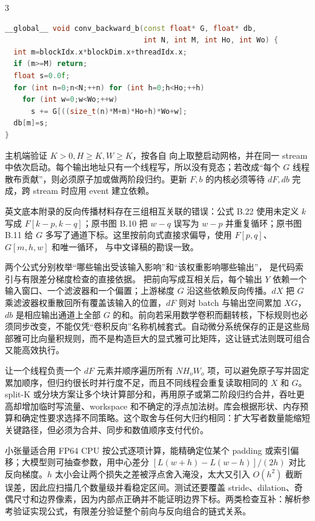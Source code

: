 \begin{solutionexercise}{3}
\begin{lstlisting}[language=C++]
__global__ void conv_backward_b(const float* G, float* db,
                                int N, int M, int Ho, int Wo) {
  int m=blockIdx.x*blockDim.x+threadIdx.x;
  if (m>=M) return;
  float s=0.0f;
  for (int n=0;n<N;++n) for (int h=0;h<Ho;++h)
    for (int w=0;w<Wo;++w)
      s += G[((size_t(n)*M+m)*Ho+h)*Wo+w];
  db[m]=s;
}
\end{lstlisting}
主机端验证 $K>0,H\ge K,W\ge K$，按各自  向上取整启动网格，并在同一
stream 中依次启动。每个输出地址只有一个线程写，所以没有竞态；若改成“每个 $G$ 线程
散布贡献”，则必须原子加或做两阶段归约。更新 $F,b$ 的内核必须等待 $dF,db$ 完成，跨
stream 时应用 event 建立依赖。

\editorialnote 英文底本附录的反向传播材料存在三组相互关联的错误：公式 B.22 使用未定义
$k$ 写成 $F[k-p,k-q]$；原书图 B.10 把 $w-q$ 误写为 $w-p$ 并重复循环；原书图 B.11 给
$G$ 多写了通道下标。这里按前向式直接求偏导，使用 $F[p,q]$、$G[m,h,w]$ 和唯一循环，
与中文译稿的勘误一致。

\conclusionheading 两个公式分别枚举“哪些输出受该输入影响”和“该权重影响哪些输出”，
是代码索引与有限差分梯度检查的直接依据。
\discussionheading
{}
把前向写成互相关后，每个输出 $Y$ 依赖一个输入窗口、一个滤波器和一个偏置；上游梯度 $G$ 沿这些依赖反向传播。$dX$ 把 $G$ 乘滤波器权重散回所有覆盖该输入的位置，$dF$ 则对 batch 与输出空间累加 $XG$，$db$ 是相应输出通道上全部 $G$ 的和。前向若采用数学卷积而翻转核，下标规则也必须同步改变，不能仅凭“卷积反向”名称机械套式。自动微分系统保存的正是这些局部雅可比向量积规则，而不是构造巨大的显式雅可比矩阵，这让链式法则既可组合又能高效执行。

让一个线程负责一个 $dF$ 元素并顺序遍历所有 $N H_o W_o$ 项，可以避免原子写并固定累加顺序，但归约很长时并行度不足，而且不同线程会重复读取相同的 $X$ 和 $G$。split-K 或分块方案让多个块计算部分和，再用原子或第二阶段归约合并，吞吐更高却增加临时写流量、workspace 和不确定的浮点加法树。库会根据形状、内存预算和确定性要求选择不同策略。这个取舍与任何大归约相同：扩大写者数量能缩短关键路径，但必须为合并、同步和数值顺序支付代价。

小张量适合用 FP64 CPU 按公式逐项计算，能精确定位某个 padding 或索引偏移；大模型则可抽查参数，用中心差分 $[L(w+h)-L(w-h)]/(2h)$ 对比反向梯度。$h$ 太小会让两个损失之差被浮点舍入淹没，太大又引入 $O(h^2)$ 截断误差，因此应扫描几个数量级并看稳定区间。测试还要覆盖 stride、dilation、奇偶尺寸和边界像素，因为内部点正确并不能证明边界下标。两类检查互补：解析参考验证实现公式，有限差分验证整个前向与反向组合的链式关系。


\end{solutionexercise}
